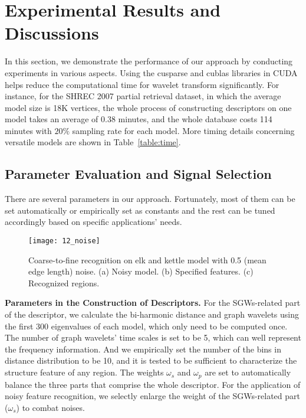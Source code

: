 \section{Experimental Results and Discussions}
\label{sec:Exp}

In this section, we demonstrate the performance of our approach by
conducting experiments in various aspects. Using the cusparse and
cublas libraries in CUDA helps reduce the computational time for wavelet transform
significantly. For instance, for the SHREC 2007 partial retrieval
dataset, in which the average model size is 18K
vertices, the whole process of constructing descriptors on one model
takes an average of 0.38 minutes, and the whole database costs 114
minutes with $20\%$ sampling rate for each model. More timing
details concerning versatile models are shown in Table~\ref{table:time}.

\subsection{Parameter Evaluation and Signal Selection}

There are several parameters in our approach.
Fortunately, most of them can be set automatically or
empirically set as constants and the rest can be tuned accordingly
based on specific applications' needs.


\begin{figure}[!to]
\texttt{[image: 12\_noise]}
\caption{Coarse-to-fine recognition on elk and kettle model with 0.5 (mean edge
  length) noise. (a) Noisy model. (b) Specified features. (c) Recognized regions.}
\label{noise}
\end{figure}


\textbf{Parameters in the Construction of Descriptors.} For the
SGWs-related part of the descriptor, we calculate the bi-harmonic
distance and graph wavelets using the first 300 eigenvalues of each
model, which only need to be computed once. The number of graph
wavelets' time scales is set to be 5, which can well represent the
frequency information. And we empirically set the number of the bins
in distance distribution to be 10, and it is tested to be sufficient
to characterize the structure feature of any region.
The weights $\omega_s$ and $\omega_p$ are set to automatically
balance the three parts that comprise the whole descriptor. For the
application of noisy feature recognition, we selectly enlarge the
weight of the SGWs-related part ($\omega_s$) to combat noises.

